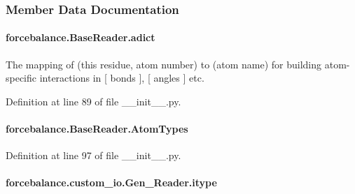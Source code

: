 \subsubsection{Member Data Documentation}
\hypertarget{classforcebalance_1_1BaseReader_a2c46ad6b66cf09a30e917ce4a1997e2a}{
\paragraph[{adict}]{\setlength{\rightskip}{0pt plus 5cm}forcebalance.\-Base\-Reader.\-adict\hspace{0.3cm}{\ttfamily [inherited]}}}\label{classforcebalance_1_1BaseReader_a2c46ad6b66cf09a30e917ce4a1997e2a}


The mapping of (this residue, atom number) to (atom name) for building atom-\/specific interactions in \mbox{[} bonds \mbox{]}, \mbox{[} angles \mbox{]} etc. 



Definition at line 89 of file \-\_\-\-\_\-init\-\_\-\-\_\-.\-py.

\hypertarget{classforcebalance_1_1BaseReader_a69ca7d949a4a3df4d9f61e617fe0e270}{
\paragraph[{Atom\-Types}]{\setlength{\rightskip}{0pt plus 5cm}forcebalance.\-Base\-Reader.\-Atom\-Types\hspace{0.3cm}{\ttfamily [inherited]}}}\label{classforcebalance_1_1BaseReader_a69ca7d949a4a3df4d9f61e617fe0e270}


Definition at line 97 of file \-\_\-\-\_\-init\-\_\-\-\_\-.\-py.

\hypertarget{classforcebalance_1_1custom__io_1_1Gen__Reader_a4712ebcb615c785b66f48c78e5ee5739}{
\paragraph[{itype}]{\setlength{\rightskip}{0pt plus 5cm}forcebalance.\-custom\-\_\-io.\-Gen\-\_\-\-Reader.\-itype}}\label{classforcebalance_1_1custom__io_1_1Gen__Reader_a4712ebcb615c785b66f48c78e5ee5739}


